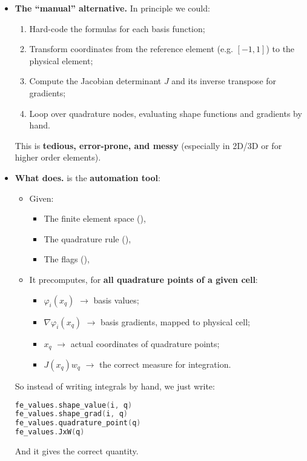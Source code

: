 \begin{itemize}
\begin{itemize}
        
        \item[\textcolor{Red2}{\faIcon{times-circle}}] \textcolor{Red2}{\textbf{The ``manual'' alternative.}} In principle we could:
        \begin{enumerate}
            \item Hard-code the formulas for each basis function;
            \item Transform coordinates from the reference element (e.g. $[-1,1]$) to the physical element;
            \item Compute the Jacobian determinant $J$ and its inverse transpose for gradients;
            \item Loop over quadrature nodes, evaluating shape functions and gradients by hand.
        \end{enumerate}
        This is \textbf{tedious, error-prone, and messy} (especially in 2D/3D or for higher order elements).


        \item[\textcolor{Green3}{\faIcon{check-circle}}] \textcolor{Green3}{\textbf{What  does.}}  is the \textbf{automation tool}:
        \begin{itemize}
            \item Given:
            \begin{itemize}
                \item The finite element space (),
                \item The quadrature rule (),
                \item The flags (),
            \end{itemize}
            \item It precomputes, for \textbf{all quadrature points of a given cell}:
            \begin{itemize}
                \item $\varphi_i(x_q)$ $\rightarrow$ basis values;
                \item $\nabla \varphi_i(x_q)$ $\rightarrow$ basis gradients, mapped to physical cell;
                \item $x_q$ $\rightarrow$ actual coordinates of quadrature points;
                \item $J(x_q) w_q$ $\rightarrow$ the correct measure for integration.
            \end{itemize}
        \end{itemize}
        So instead of writing integrals by hand, we just write:
        \begin{lstlisting}[language=C++]
fe_values.shape_value(i, q)
fe_values.shape_grad(i, q)
fe_values.quadrature_point(q)
fe_values.JxW(q)\end{lstlisting}
        And it gives the correct quantity.
    \end{itemize}



\end{itemize}
